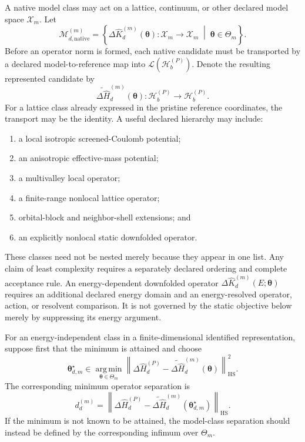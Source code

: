 A native model class may act on a lattice, continuum, or other declared model
space $\mathcal X_m$. Let
\begin{equation}
    \mathcal M_{d,\mathrm{native}}^{(m)}
    =
    \left\{
        \Delta\hat K_d^{(m)}(\boldsymbol\theta):
        \mathcal X_m\longrightarrow\mathcal X_m
        \;\middle|\;
        \boldsymbol\theta\in\Theta_m
    \right\}.
\end{equation}
Before an operator norm is formed, each native candidate must be transported by
a declared model-to-reference map into
$\mathcal L(\mathcal H_b^{(P)})$. Denote the resulting represented candidate by
\begin{equation}
    \widetilde{\Delta\hat H}_d^{(m)}(\boldsymbol\theta):
    \mathcal H_b^{(P)}
    \longrightarrow
    \mathcal H_b^{(P)}.
\end{equation}
For a lattice class already expressed in the pristine reference coordinates,
the transport may be the identity. A useful declared hierarchy may include:
\begin{enumerate}
    \item a local isotropic screened-Coulomb potential;
    \item an anisotropic effective-mass potential;
    \item a multivalley local operator;
    \item a finite-range nonlocal lattice operator;
    \item orbital-block and neighbor-shell extensions; and
    \item an explicitly nonlocal static downfolded operator.
\end{enumerate}
These classes need not be nested merely because they appear in one list. Any
claim of least complexity requires a separately declared ordering and complete
acceptance rule. An energy-dependent downfolded operator
$\Delta\hat K_d^{(m)}(E;\boldsymbol\theta)$ requires an additional declared
energy domain and an energy-resolved operator, action, or resolvent comparison.
It is not governed by the static objective below merely by suppressing its
energy argument.

For an energy-independent class in a finite-dimensional identified
representation, suppose first that the minimum is attained and choose
\begin{equation}
    \boldsymbol\theta_{d,m}^{\star}
    \in
    \operatorname*{arg\,min}_{\boldsymbol\theta\in\Theta_m}
    \left\lVert
        \Delta\hat H_d^{(P)}
        -
        \widetilde{\Delta\hat H}_d^{(m)}(\boldsymbol\theta)
    \right\rVert_{\mathrm{HS}}^2.
\end{equation}
The corresponding minimum operator separation is
\begin{equation}
    d_d^{(m)}
    =
    \left\lVert
        \Delta\hat H_d^{(P)}
        -
        \widetilde{\Delta\hat H}_d^{(m)}
        (\boldsymbol\theta_{d,m}^{\star})
    \right\rVert_{\mathrm{HS}}.
\end{equation}
If the minimum is not known to be attained, the model-class separation should
instead be defined by the corresponding infimum over $\Theta_m$.

